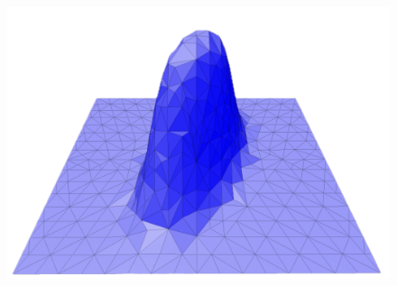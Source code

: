 \begin{figure}
        \label{fig:bell_refined}
        \includegraphics[width=0.94\columnwidth]{../images/bell_embedded.png}
        \label{fig:bell_embedded}
    \end{figure}

